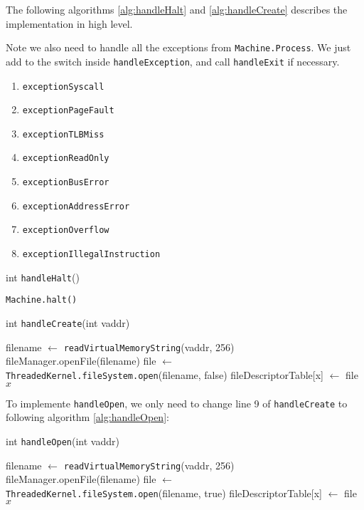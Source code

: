 \documentclass{article}
\begin{document}
\begin{spacing}{1.1}
The following algorithms \ref{alg:handleHalt} and \ref{alg:handleCreate} describes the implementation in high level.

Note we also need to handle all the exceptions from \texttt{Machine.Process}. We just add to the switch inside \texttt{handleException}, and call \texttt{handleExit} if necessary.
\begin{enumerate}[$\bullet$]
\item \texttt{exceptionSyscall}
\item \texttt{exceptionPageFault}
\item \texttt{exceptionTLBMiss}
\item \texttt{exceptionReadOnly}
\item \texttt{exceptionBusError}
\item \texttt{exceptionAddressError}
\item \texttt{exceptionOverflow}
\item \texttt{exceptionIllegalInstruction}
\end{enumerate}

\begin{algorithm}[htbp]
  \label{alg:handleHalt}
  \caption{int \texttt{handleHalt}()}
\begin{algorithmic}[1]
  \EndIf
  \State \texttt{Machine.halt()}
\end{algorithmic}
\end{algorithm}

\begin{algorithm}[htbp]
  \label{alg:handleCreate}
  \caption{int \texttt{handleCreate}(int vaddr)}
\begin{algorithmic}[1]
  \EndIf
  \State filename $\leftarrow$ \texttt{readVirtualMemoryString}(vaddr, 256)
  \EndIf
    \State fileManager.openFile(filename)
    \State file $\leftarrow$ \texttt{ThreadedKernel.fileSystem.open}(filename, false)
    \State fileDescriptorTable[x] $\leftarrow$ file
    \Return $x$
  \Else
  \EndIf
\end{algorithmic}
\end{algorithm}

To implemente \texttt{handleOpen}, we only need to change line 9 of \texttt{handleCreate} to following algorithm \ref{alg:handleOpen}:
\begin{algorithm}[htbp]
  \label{alg:handleOpen}
  \caption{int \texttt{handleOpen}(int vaddr)}
\begin{algorithmic}[1]
  \EndIf
  \State filename $\leftarrow$ \texttt{readVirtualMemoryString}(vaddr, 256)
  \EndIf
    \State fileManager.openFile(filename)
    \State \colorbox{myyellow}{file $\leftarrow$ \texttt{ThreadedKernel.fileSystem.open}(filename, true)}
    \State fileDescriptorTable[x] $\leftarrow$ file
    \Return $x$
  \Else
  \EndIf
\end{algorithmic}
\end{algorithm}


\end{spacing}
\end{document}
